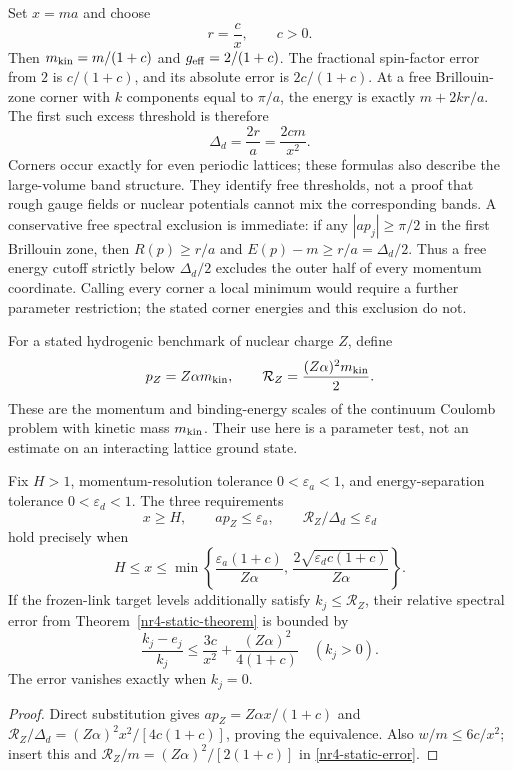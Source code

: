 Set $x=ma$ and choose
\begin{equation}
 r=\frac c x,\qquad c>0.
 \label{nr4-scaled-r}
\end{equation}
Then $m_{\rm kin}=m/(1+c)$ and $g_{\rm eff}=2/(1+c)$.
The fractional spin-factor error from $2$ is $c/(1+c)$, and its
absolute error is $2c/(1+c)$. At a free Brillouin-zone corner with
$k$ components equal to $\pi/a$, the energy is exactly $m+2kr/a$.
The first such excess threshold is therefore
\begin{equation}
 \Delta_d=\frac{2r}a=\frac{2cm}{x^2}.
 \label{nr4-doubler-scale}
\end{equation}
Corners occur exactly for even periodic lattices; these formulas also
describe the large-volume band structure. They identify free thresholds,
not a proof that rough gauge fields or nuclear potentials cannot mix
the corresponding bands.
A conservative free spectral exclusion is immediate: if any
$|ap_j|\ge\pi/2$ in the first Brillouin zone, then $R(p)\ge r/a$ and
$E(p)-m\ge r/a=\Delta_d/2$. Thus a free energy cutoff strictly below
$\Delta_d/2$ excludes the outer half of every momentum coordinate.
Calling every corner a local minimum would require a further parameter
restriction; the stated corner energies and this exclusion do not.

For a stated hydrogenic benchmark of nuclear charge $Z$, define
\begin{equation}
 p_Z=Z\alpha m_{\rm kin},\qquad
 \mathcal R_Z=\frac{(Z\alpha)^2m_{\rm kin}}2.
 \label{nr4-hydrogenic-scales}
\end{equation}
These are the momentum and binding-energy scales of the continuum
Coulomb problem with kinetic mass $m_{\rm kin}$. Their use here is a
parameter test, not an estimate on an interacting lattice ground state.

\begin{proposition}
\label{nr4-hierarchy}
Fix $H>1$, momentum-resolution tolerance $0<\varepsilon_a<1$, and
energy-separation tolerance $0<\varepsilon_d<1$. The three requirements
\[
 x\ge H,\qquad ap_Z\le\varepsilon_a,\qquad
 \mathcal R_Z/\Delta_d\le\varepsilon_d
\]
hold precisely when
\begin{equation}
 H\le x\le\min\left\{
 \frac{\varepsilon_a(1+c)}{Z\alpha},\,
 \frac{2\sqrt{\varepsilon_dc(1+c)}}{Z\alpha}\right\}.
 \label{nr4-window}
\end{equation}
If the frozen-link target levels additionally satisfy $k_j\le\mathcal R_Z$,
their relative spectral error from Theorem~\ref{nr4-static-theorem} is
bounded by
\begin{equation}
 \frac{k_j-e_j}{k_j}\le\frac{3c}{x^2}
                      +\frac{(Z\alpha)^2}{4(1+c)}
 \quad (k_j>0).
 \label{nr4-scaled-relative-error}
\end{equation}
The error vanishes exactly when $k_j=0$.
\end{proposition}
\begin{proof}
Direct substitution gives $ap_Z=Z\alpha x/(1+c)$ and
$\mathcal R_Z/\Delta_d=(Z\alpha)^2x^2/[4c(1+c)]$, proving the
equivalence. Also $w/m\le6c/x^2$; insert this and
$\mathcal R_Z/m=(Z\alpha)^2/[2(1+c)]$ in
\eqref{nr4-static-error}.
\end{proof}

